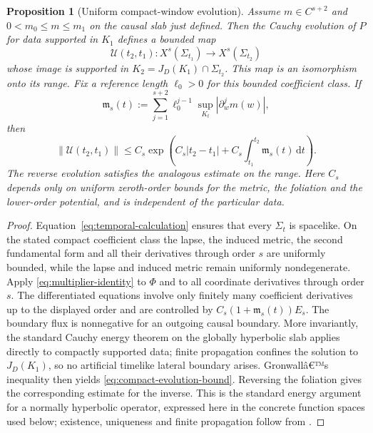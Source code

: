 \documentclass[11pt,a4paper]{article}
\newtheorem{proposition}[theorem]{Proposition}
\theoremstyle{definition}
\theoremstyle{remark}
\begin{document}
	\begin{proposition}[Uniform compact-window evolution]
		\label{prop:compact-evolution}
		Assume \(m\in C^{s+2}\) and \(0<m_0\leq m\leq m_1\) on the causal slab just defined. Then the Cauchy evolution of \(P\) for data supported in \(K_1\) defines a bounded map
		\begin{equation}
			\mathcal{U}(t_2,t_1):X^s(\Sigma_{t_1})\longrightarrow X^s(\Sigma_{t_2})
		\end{equation}
		whose image is supported in \(K_2=J_D(K_1)\cap\Sigma_{t_2}\). This map is an isomorphism onto its range. Fix a reference length \(\ell_0>0\) for this bounded coefficient class. If
		\begin{equation}
			\mathfrak{m}_s(t):=\sum_{j=1}^{s+2}\ell_0^{j-1}\sup_{K_t}|\partial_w^j m(w)|,
		\end{equation}
		then
		\begin{equation}
			\|\mathcal{U}(t_2,t_1)\|\leq C_s\exp\!\left(C_s|t_2-t_1|+C_s\int_{t_1}^{t_2}\mathfrak{m}_s(t)\,\mathrm{d}t\right).
			\label{eq:compact-evolution-bound}
		\end{equation}
		The reverse evolution satisfies the analogous estimate on the range. Here \(C_s\) depends only on uniform zeroth-order bounds for the metric, the foliation and the lower-order potential, and is independent of the particular data.
	\end{proposition}
	
	\begin{proof}
		Equation~\eqref{eq:temporal-calculation} ensures that every \(\Sigma_t\) is spacelike. On the stated compact coefficient class the lapse, the induced metric, the second fundamental form and all their derivatives through order \(s\) are uniformly bounded, while the lapse and induced metric remain uniformly nondegenerate. Apply \eqref{eq:multiplier-identity} to \(\Phi\) and to all coordinate derivatives through order \(s\). The differentiated equations involve only finitely many coefficient derivatives up to the displayed order and are controlled by \(C_s(1+\mathfrak{m}_s(t))E_s\). The boundary flux is nonnegative for an outgoing causal boundary. More invariantly, the standard Cauchy energy theorem on the globally hyperbolic slab applies directly to compactly supported data; finite propagation confines the solution to \(J_D(K_1)\), so no artificial timelike lateral boundary arises. Gronwallâ€™s inequality then yields \eqref{eq:compact-evolution-bound}. Reversing the foliation gives the corresponding estimate for the inverse. This is the standard energy argument for a normally hyperbolic operator, expressed here in the concrete function spaces used below; existence, uniqueness and finite propagation follow from \cite{BaerGinouxPfaeffle2007}.
	\end{proof}
	
\end{document}

